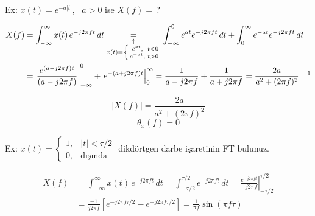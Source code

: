 \documentclass[11pt,a4paper]{article}
\begin{document}
\begin{ornek}
Ex: $x(t)=e^{-a|t|}$, \ $a>0$ ise $X(f)=\,?$
\end{ornek}
\begin{align*}
X(f) &= \int_{-\infty}^{\infty} x(t)\,e^{-j2\pi ft}\,dt
\underset{\substack{\uparrow\\ x(t)=\left\{\begin{smallmatrix} e^{at}, & t<0\\ e^{-at}, & t>0\end{smallmatrix}\right.}}{=}
\int_{-\infty}^{0} e^{at}e^{-j2\pi ft}\,dt+\int_{0}^{\infty} e^{-at}e^{-j2\pi ft}\,dt\\
&= \left.\frac{e^{(a-j2\pi f)t}}{(a-j2\pi f)}\right|_{-\infty}^{0}+\left.e^{-(a+j2\pi f)t}\right|_{0}^{\infty}
=\frac{1}{a-j2\pi f}+\frac{1}{a+j2\pi f}=\frac{2a}{a^2+(2\pi f)^2}\quad\text{\footnotemark}
\end{align*}

\noindent
\begin{minipage}[c]{0.4\linewidth}
\[ |X(f)|=\frac{2a}{a^2+(2\pi f)^2} \]
\[ \theta_x(f)=0 \]
\end{minipage}\hfill
\begin{minipage}[c]{0.56\linewidth}
\centering
{}
\end{minipage}

\begin{ornek}
Ex: $x(t)=\begin{cases} 1, & |t|<\tau/2\\ 0, & \text{dışında}\end{cases}$ \quad dikdörtgen darbe işaretinin FT bulunuz.
\end{ornek}
\begin{center}
\end{center}
\begin{align*}
X(f) &= \int_{-\infty}^{\infty} x(t)\,e^{-j2\pi ft}\,dt=\int_{-\tau/2}^{\tau/2} e^{-j2\pi ft}\,dt=\left.\frac{e^{-j2\pi ft}}{-j2\pi f}\right|_{-\tau/2}^{\tau/2}\\
&= \frac{-1}{j2\pi f}\left[e^{-j2\pi f\tau/2}-e^{+j2\pi f\tau/2}\right]=\frac{1}{\pi f}\sin(\pi f\tau)
\end{align*}
\end{document}
